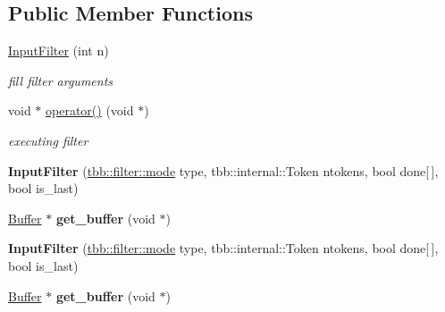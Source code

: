\subsection*{Public Member Functions}
\begin{DoxyCompactItemize}
\item 
\hypertarget{classInputFilter_aeee293d1b346ee97f516e00da025f084}{}\hyperlink{classInputFilter_aeee293d1b346ee97f516e00da025f084}{Input\+Filter} (int n)\label{classInputFilter_aeee293d1b346ee97f516e00da025f084}

\begin{DoxyCompactList}\small\item\em fill filter arguments \end{DoxyCompactList}\item 
\hypertarget{classInputFilter_a8b26e42b9414aabad06853540772f771}{}void $\ast$ \hyperlink{classInputFilter_a8b26e42b9414aabad06853540772f771}{operator()} (void $\ast$)\label{classInputFilter_a8b26e42b9414aabad06853540772f771}

\begin{DoxyCompactList}\small\item\em executing filter \end{DoxyCompactList}\item 
\hypertarget{classInputFilter_af2130dd63ab7d67c02370c58f2b5fe7e}{}{\bfseries Input\+Filter} (\hyperlink{classtbb_1_1filter_a8145c736bafcf0b401d50bf1a1df9125}{tbb\+::filter\+::mode} type, tbb\+::internal\+::\+Token ntokens, bool done\mbox{[}$\,$\mbox{]}, bool is\+\_\+last)\label{classInputFilter_af2130dd63ab7d67c02370c58f2b5fe7e}

\item 
\hypertarget{classInputFilter_acd8db8e65ee878418e24bbce50bcbf26}{}\hyperlink{structBuffer}{Buffer} $\ast$ {\bfseries get\+\_\+buffer} (void $\ast$)\label{classInputFilter_acd8db8e65ee878418e24bbce50bcbf26}

\item 
\hypertarget{classInputFilter_af2130dd63ab7d67c02370c58f2b5fe7e}{}{\bfseries Input\+Filter} (\hyperlink{classtbb_1_1filter_a8145c736bafcf0b401d50bf1a1df9125}{tbb\+::filter\+::mode} type, tbb\+::internal\+::\+Token ntokens, bool done\mbox{[}$\,$\mbox{]}, bool is\+\_\+last)\label{classInputFilter_af2130dd63ab7d67c02370c58f2b5fe7e}

\item 
\hypertarget{classInputFilter_acd8db8e65ee878418e24bbce50bcbf26}{}\hyperlink{structBuffer}{Buffer} $\ast$ {\bfseries get\+\_\+buffer} (void $\ast$)\label{classInputFilter_acd8db8e65ee878418e24bbce50bcbf26}

\end{DoxyCompactItemize}
